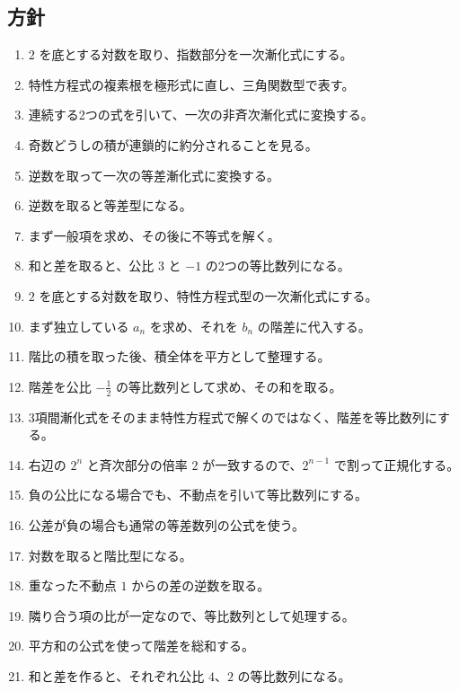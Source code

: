     \subsection{方針}\label{節：基本と応用から出題されるもの：方針}
      \begin{enumerate}[label=\textbf{問\arabic*.},leftmargin=3.8em,format=\bookitemlink{practice-basic}{hint}{problem}]
        \item \(2\) を底とする対数を取り、指数部分を一次漸化式にする。
        \item 特性方程式の複素根を極形式に直し、三角関数型で表す。
        \item 連続する2つの式を引いて、一次の非斉次漸化式に変換する。
        \item 奇数どうしの積が連鎖的に約分されることを見る。
        \item 逆数を取って一次の等差漸化式に変換する。
        \item 逆数を取ると等差型になる。
        \item まず一般項を求め、その後に不等式を解く。
        \item 和と差を取ると、公比 \(3\) と \(-1\) の2つの等比数列になる。
        \item \(2\) を底とする対数を取り、特性方程式型の一次漸化式にする。
        \item まず独立している \(a_n\) を求め、それを \(b_n\) の階差に代入する。
        \item 階比の積を取った後、積全体を平方として整理する。
        \item 階差を公比 \(-\frac{1}{2}\) の等比数列として求め、その和を取る。
        \item 3項間漸化式をそのまま特性方程式で解くのではなく、階差を等比数列にする。
        \item 右辺の \(2^n\) と斉次部分の倍率 \(2\) が一致するので、\(2^{n-1}\) で割って正規化する。
        \item 負の公比になる場合でも、不動点を引いて等比数列にする。
        \item 公差が負の場合も通常の等差数列の公式を使う。
        \item 対数を取ると階比型になる。
        \item 重なった不動点 \(1\) からの差の逆数を取る。
        \item 隣り合う項の比が一定なので、等比数列として処理する。
        \item 平方和の公式を使って階差を総和する。
        \item 和と差を作ると、それぞれ公比 \(4\)、\(2\) の等比数列になる。

\end{enumerate}
